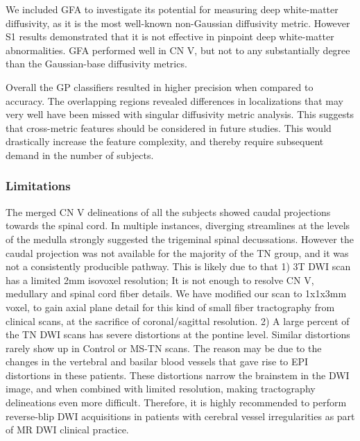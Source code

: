 We included GFA to investigate its potential for measuring deep white-matter diffusivity, as it is the most well-known non-Gaussian diffusivity metric. However S1 results demonstrated that it is not effective in pinpoint deep white-matter abnormalities. GFA performed well in CN V, but not to any substantially degree than the Gaussian-base diffusivity metrics. 

Overall the GP classifiers resulted in higher precision when compared to accuracy. The overlapping regions revealed differences in localizations that may very well have been missed with singular diffusivity metric analysis. This suggests that cross-metric features should be considered in future studies. This would drastically increase the feature complexity, and thereby require subsequent demand in the number of subjects. 

\subsubsection{Limitations}
The merged CN V delineations of all the subjects showed caudal projections towards the spinal cord. In multiple instances, diverging streamlines at the levels of the medulla strongly suggested the trigeminal spinal decussations. However the caudal projection was not available for the majority of the TN group, and it was not a consistently producible pathway. This is likely due to that 1) 3T DWI scan has a limited 2mm isovoxel resolution; It is not enough to resolve CN V, medullary and spinal cord fiber details. We have modified our scan to 1x1x3mm voxel, to gain axial plane detail for this kind of small fiber tractography from clinical scans, at the sacrifice of coronal/sagittal resolution. 2) A large percent of the TN DWI scans has severe distortions at the pontine level. Similar distortions rarely show up in Control or MS-TN scans. The reason may be due to the changes in the vertebral and basilar blood vessels that gave rise to EPI distortions in these patients. These distortions narrow the brainstem in the DWI image, and when combined with limited resolution, making tractography delineations even more difficult. Therefore, it is highly recommended to perform reverse-blip DWI acquisitions in patients with cerebral vessel irregularities as part of MR DWI clinical practice. 

